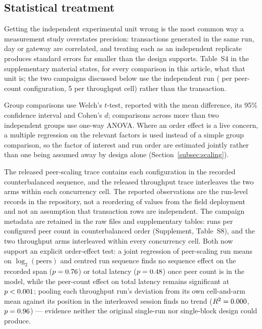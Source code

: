 \documentclass[a4paper,fleqn]{cas-sc}
\begin{document}
\subsection{Statistical treatment}
\label{subsec:stats}

Getting the independent experimental unit wrong is the most common way a
measurement study overstates precision: transactions generated in the same
run, day or gateway are correlated, and treating each as an independent
replicate produces standard errors far smaller than the design supports.
Table~S4 in the supplementary material states, for every comparison in
this article, what that unit is; the two campaigns discussed below use the
independent run (\PartRunsPerConfig{} per peer-count configuration, 5 per
throughput cell) rather than the transaction.

Group comparisons use Welch's $t$-test, reported with the mean difference,
its 95\% confidence interval and Cohen's $d$; comparisons across more than
two independent groups use one-way ANOVA. Where an order effect is a live
concern, a multiple regression on the relevant factors is used instead of a
simple group comparison, so the factor of interest and run order are
estimated jointly rather than one being assumed away by design alone
(Section~\ref{subsec:scaling}).

The released peer-scaling trace contains each configuration in the recorded
counterbalanced sequence, and the released throughput trace interleaves the
two arms within each concurrency cell. The reported observations are the
run-level records in the repository, not a reordering of values from the
field deployment and not an assumption that transaction rows are
independent. The campaign metadata are retained in the raw files and
supplementary tables: \PartRunsPerConfig{} runs per configured peer count in
counterbalanced order (Supplement, Table~S8), and the two throughput arms
interleaved within every concurrency cell. Both now support an explicit
order-effect
test: a joint regression of peer-scaling run means on $\log_2(\text{peers})$
and centred run sequence finds no sequence effect on the recorded span
($p=0.76$) or total latency ($p=0.48$) once
peer count is in the model, while the peer-count effect on total latency
remains significant at $p<0.001$; pooling each throughput
run's deviation from its own cell-and-arm mean against its position in the
interleaved session finds no trend ($R^2=0.000$, $p=0.96$)
— evidence
neither the original single-run nor single-block design could produce.
\end{document}
